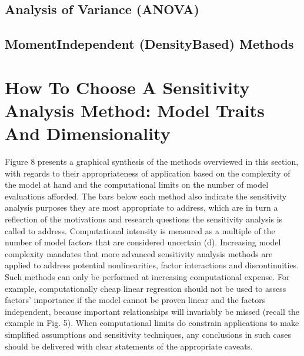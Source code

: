 \documentclass[letterpaper,10pt,english]{sphinxmanual}
\begin{document}
\subsection{Analysis of Variance (ANOVA)}
\label{\detokenize{3_sensitivity_analysis_the_basics:analysis-of-variance-anova}}

\subsection{Moment\sphinxhyphen{}Independent (Density\sphinxhyphen{}Based) Methods}
\label{\detokenize{3_sensitivity_analysis_the_basics:moment-independent-density-based-methods}}

\section{How To Choose A Sensitivity Analysis Method: Model Traits And Dimensionality}
\label{\detokenize{3_sensitivity_analysis_the_basics:how-to-choose-a-sensitivity-analysis-method-model-traits-and-dimensionality}}
\sphinxAtStartPar
Figure 8 presents a graphical synthesis of the methods overviewed in this section, with regards to their appropriateness of application based on the complexity of the model at hand and the computational limits on the number of model evaluations afforded. The bars below each method also indicate the sensitivity analysis purposes they are most appropriate to address, which are in turn a reflection of the motivations and research questions the sensitivity analysis is called to address. Computational intensity is measured as a multiple of the number of model factors that are considered uncertain (d). Increasing model complexity mandates that more advanced sensitivity analysis methods are applied to address potential nonlinearities, factor interactions and discontinuities. Such methods can only be performed at increasing computational expense. For example, computationally cheap linear regression should not be used to assess factors’ importance if the model cannot be proven linear and the factors independent, because important relationships will invariably be missed (recall the example in Fig. 5). When computational limits do constrain applications to make simplified assumptions and sensitivity techniques, any conclusions in such cases should be delivered with clear statements of the appropriate caveats.
\end{document}
